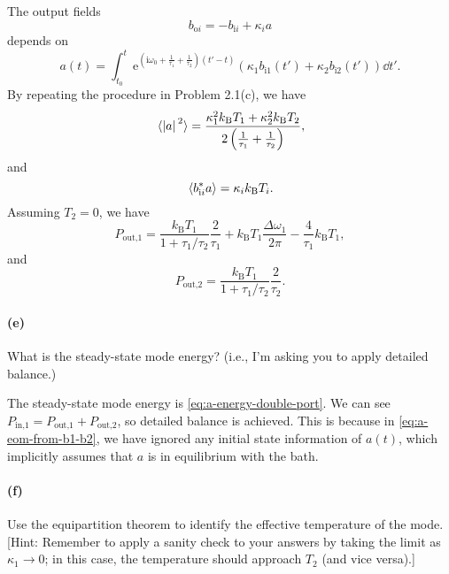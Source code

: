 \documentclass[hyperref, a4paper]{article}
\newcommand*{\ii}{\mathrm{i}}
\newcommand*{\ee}{\mathrm{e}}
\newcommand*{\kB}{k_{\text{B}}}
\newcommand*{\bii}[1]{b_{\text{i#1}}}
\newcommand*{\boi}[1]{b_{\text{o#1}}}
\begin{document}
The output fields 
\begin{equation}
    \boi{$i$} = - \bii{$i$} + \kappa_i a
\end{equation}
depends on 
\begin{equation}
    a(t) = \int_{t_0}^{t} \ee^{\left( \ii \omega_0 + \frac{1}{\tau_1} + \frac{1}{\tau_2} \right) (t' - t)} (\kappa_1 \bii{1}(t') + \kappa_2 \bii{2}(t')) \dd{t'}.
    \label{eq:a-eom-from-b1-b2}
\end{equation}
By repeating the procedure in Problem 2.1(c), we have 
\begin{equation}
    \expval*{\abs*{a}^2} = \frac{\kappa_1^2 \kB T_1 + \kappa_2^2 \kB T_2}{2 \left( \frac{1}{\tau_1} + \frac{1}{\tau_2} \right)},
    \label{eq:a-energy-double-port}
\end{equation}
and 
\begin{equation}
    \expval*{\bii{$i$}^* a} = \kappa_i \kB T_i.
\end{equation}
Assuming $T_2 = 0$, we have 
\begin{equation}
    P_{\text{out,1}} = \frac{\kB T_1}{1 + \tau_1 / \tau_2} \frac{2}{\tau_1} + \kB T_1 \frac{\Delta \omega_1}{2\pi} - \frac{4}{\tau_1} \kB T_1,
\end{equation}
and 
\begin{equation}
    P_{\text{out,2}} = \frac{\kB T_1}{1 + \tau_1 / \tau_2} \frac{2}{\tau_2} .
\end{equation}

\paragraph*{(e)} What is the steady-state mode energy? (i.e., I'm asking you to apply detailed balance.)

The steady-state mode energy is \eqref{eq:a-energy-double-port}.
We can see $P_{\text{in,1}} = P_{\text{out,1}} + P_{\text{out,2}}$,
so detailed balance is achieved.
This is because in \eqref{eq:a-eom-from-b1-b2},
we have ignored any initial state information of $a(t)$,
which implicitly assumes that $a$ is in equilibrium with the bath.

\paragraph*{(f)} Use the equipartition theorem to identify the effective temperature of the mode. [Hint: Remember to apply a sanity check to your answers by taking the limit as $\kappa_1 \rightarrow 0$; in this case, the temperature should approach $T_2$ (and vice versa).]
\end{document}
